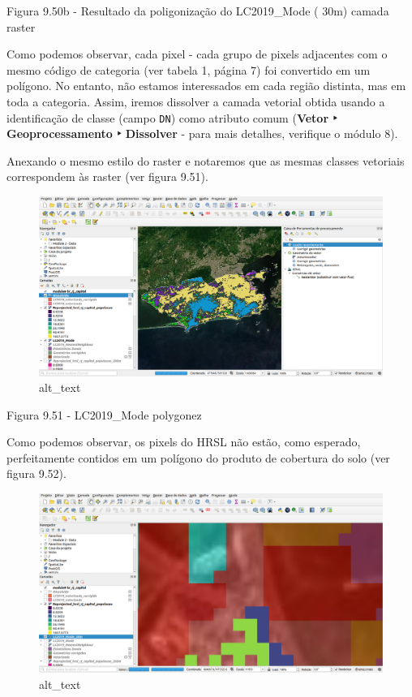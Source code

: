 \documentclass[
]{book}
\begin{document}
Figura 9.50b - Resultado da poligonização do LC2019\_Mode ( 30m) camada raster

Como podemos observar, cada pixel - cada grupo de pixels adjacentes com o mesmo código de categoria (ver tabela 1, página 7) foi convertido em um polígono. No entanto, não estamos interessados \hspace{0pt}\hspace{0pt}em cada região distinta, mas em toda a categoria. Assim, iremos dissolver a camada vetorial obtida usando a identificação de classe (campo \texttt{DN}) como atributo comum (\textbf{Vetor ‣ Geoprocessamento ‣ Dissolver} - para mais detalhes, verifique o módulo 8).

Anexando o mesmo estilo do raster e notaremos que as mesmas classes vetoriais correspondem às raster (ver figura 9.51).

\begin{figure}
\centering
\includegraphics{media/modulo9/fig951.png}
\caption{alt\_text}
\end{figure}

Figura 9.51 - LC2019\_Mode polygonez

Como podemos observar, os pixels do HRSL não estão, como esperado, perfeitamente contidos em um polígono do produto de cobertura do solo (ver figura 9.52).

\begin{figure}
\centering
\includegraphics{media/modulo9/fig952.png}
\caption{alt\_text}
\end{figure}
\end{document}
